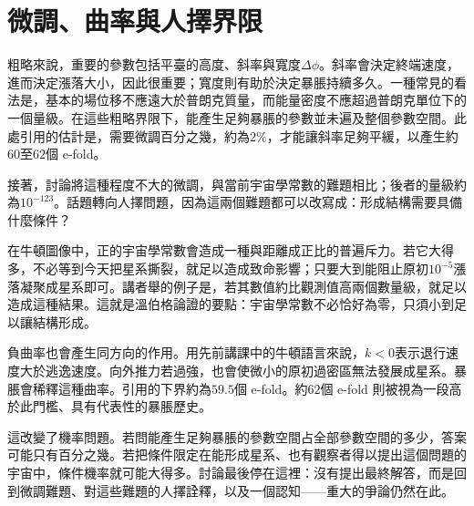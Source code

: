 \section{微調、曲率與人擇界限}

粗略來說，重要的參數包括平臺的高度、斜率與寬度\(\Delta\phi\)。斜率會決定終端速度，進而決定漲落大小，因此很重要；寬度則有助於決定暴脹持續多久。一種常見的看法是，基本的場位移不應遠大於普朗克質量，而能量密度不應超過普朗克單位下的一個量級。在這些粗略界限下，能產生足夠暴脹的參數並未遍及整個參數空間。此處引用的估計是，需要微調百分之幾，約為\(2\%\)，才能讓斜率足夠平緩，以產生約\(60\)至\(62\)個 e-fold。

\begin{classroomqa}
\end{classroomqa}

接著，討論將這種程度不大的微調，與當前宇宙學常數的難題相比；後者的量級約為\(10^{-123}\)。話題轉向人擇問題，因為這兩個難題都可以改寫成：形成結構需要具備什麼條件？

在牛頓圖像中，正的宇宙學常數會造成一種與距離成正比的普遍斥力。若它大得多，不必等到今天把星系撕裂，就足以造成致命影響；只要大到能阻止原初\(10^{-5}\)漲落凝聚成星系即可。講者舉的例子是，若其數值約比觀測值高兩個數量級，就足以造成這種結果。這就是溫伯格論證的要點：宇宙學常數不必恰好為零，只須小到足以讓結構形成。

負曲率也會產生同方向的作用。用先前講課中的牛頓語言來說，\(k<0\)表示退行速度大於逃逸速度。向外推力若過強，也會使微小的原初過密區無法發展成星系。暴脹會稀釋這種曲率。引用的下界約為\(59.5\)個 e-fold。約\(62\)個 e-fold 則被視為一段高於此門檻、具有代表性的暴脹歷史。

這改變了機率問題。若問能產生足夠暴脹的參數空間占全部參數空間的多少，答案可能只有百分之幾。若把條件限定在能形成星系、也有觀察者得以提出這個問題的宇宙中，條件機率就可能大得多。討論最後停在這裡：沒有提出最終解答，而是回到微調難題、對這些難題的人擇詮釋，以及一個認知——重大的爭論仍然在此。